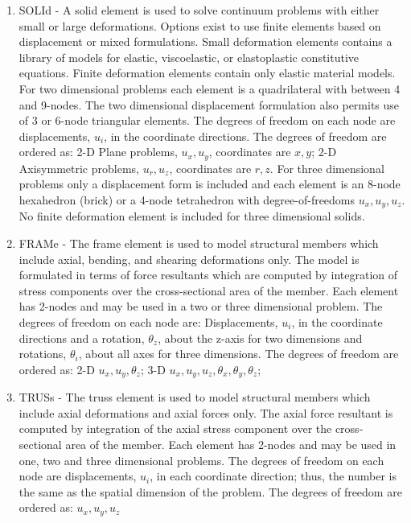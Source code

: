 \begin{enumerate}
\item
SOLId - A solid element is used to solve continuum problems with
either small or large deformations.  Options exist to use finite
elements based on displacement or mixed formulations.
Small deformation elements contains a library of
models for elastic, viscoelastic, or elastoplastic constitutive equations.
Finite deformation elements contain only elastic material models.
For two dimensional problems each element is a quadrilateral
with between 4 and 9-nodes.  The two dimensional displacement formulation
also permits use of 3 or 6-node triangular elements.
The degrees of freedom on each node are displacements,
$u_i$, in the coordinate directions.
The degrees of freedom are ordered as:
2-D Plane problems, $u_x , u_y $, coordinates are $x , y$;
2-D Axisymmetric problems, $u_r , u_z $, coordinates are $r , z$.
For three dimensional problems only a displacement form is included and each
element is an 8-node hexahedron (brick) or a 4-node tetrahedron
with degree-of-freedoms $u_x , u_y , u_z$.
No finite deformation element is included for three dimensional solids.

\item
FRAMe - The frame element is used to model structural members which include
axial, bending, and shearing deformations only.  The model is formulated in
terms of force resultants which are computed by integration of stress components
over the cross-sectional area of the member.
Each element has 2-nodes and may be used in a two or three dimensional
problem.  The degrees of freedom on each node are: Displacements, $u_i$, in the
coordinate directions and a rotation, $\theta_z$, about the z-axis
for two dimensions
and rotations, $\theta_i$, about all axes for three dimensions.
The degrees of freedom are ordered as:
2-D $u_x , u_y , \theta_z$;
3-D $u_x , u_y , u_z , \theta_x , \theta_y , \theta_z$;

\item
TRUSs - The truss element is used to model structural members which include
axial deformations and axial forces only.  The axial
force resultant is computed by integration of the axial stress component
over the cross-sectional area of the member.
Each element has 2-nodes and may be used in one, two and three dimensional
problems.  The degrees of freedom on each node are displacements, $u_i$, in each
coordinate direction; thus, the number is the same as the spatial dimension
of the problem.
The degrees of freedom are ordered as: $u_x , u_y , u_z$


\end{enumerate}
